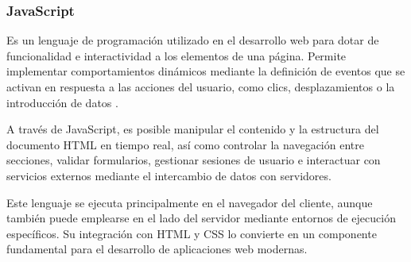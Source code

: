 
\subsubsection{JavaScript}

Es un lenguaje de programación utilizado en el desarrollo web para dotar de funcionalidad e interactividad a los elementos de una página. Permite implementar comportamientos dinámicos mediante la definición de eventos que se activan en respuesta a las acciones del usuario, como clics, desplazamientos o la introducción de datos \parencite[]{JSmdn}.

A través de JavaScript, es posible manipular el contenido y la estructura del documento HTML en tiempo real, así como controlar la navegación entre secciones, validar formularios, gestionar sesiones de usuario e interactuar con servicios externos mediante el intercambio de datos con servidores.

Este lenguaje se ejecuta principalmente en el navegador del cliente, aunque también puede emplearse en el lado del servidor mediante entornos de ejecución específicos. Su integración con HTML y CSS lo convierte en un componente fundamental para el desarrollo de aplicaciones web modernas.